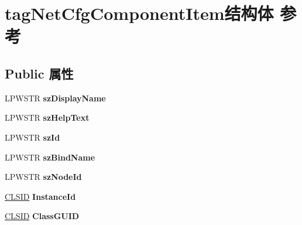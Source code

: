 \hypertarget{structtag_net_cfg_component_item}{}\section{tag\+Net\+Cfg\+Component\+Item结构体 参考}
\label{structtag_net_cfg_component_item}
\subsection*{Public 属性}
\begin{DoxyCompactItemize}
\item 
\mbox{\label{structtag_net_cfg_component_item_ab9bc7f9be4cdc8bcccfca0b74ae50951}} 
L\+P\+W\+S\+TR {\bfseries sz\+Display\+Name}
\item 
\mbox{\label{structtag_net_cfg_component_item_a8219eb7dfeffc82768c50891fcc2b412}} 
L\+P\+W\+S\+TR {\bfseries sz\+Help\+Text}
\item 
\mbox{\label{structtag_net_cfg_component_item_ac9af0120114ea7511f4a08c155b58938}} 
L\+P\+W\+S\+TR {\bfseries sz\+Id}
\item 
\mbox{\label{structtag_net_cfg_component_item_a4b42bcb6775be781297f16932ac4749a}} 
L\+P\+W\+S\+TR {\bfseries sz\+Bind\+Name}
\item 
\mbox{\label{structtag_net_cfg_component_item_ac35b8591cbacfe281c774588006d221c}} 
L\+P\+W\+S\+TR {\bfseries sz\+Node\+Id}
\item 
\mbox{\label{structtag_net_cfg_component_item_a91912808b69f998dd58c2b700288b3be}} 
\hyperlink{struct___i_i_d}{C\+L\+S\+ID} {\bfseries Instance\+Id}
\item 
\mbox{\label{structtag_net_cfg_component_item_ac749fe3be662f1edbfc52ad20e5c3ccd}} 
\hyperlink{struct___i_i_d}{C\+L\+S\+ID} {\bfseries Class\+G\+U\+ID}
\item 
\mbox{\label{structtag_net_cfg_component_item_a10c31991e2cc6cfac4565d80d5a3a39f}} 

\end{DoxyCompactItemize}
